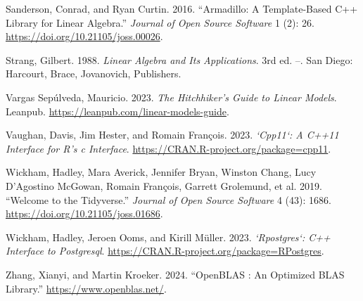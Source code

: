 \begin{cslreferences}
\leavevmode\hypertarget{ref-sanderson2016}{}%
Sanderson, Conrad, and Ryan Curtin. 2016. ``Armadillo: A Template-Based C++ Library for Linear Algebra.'' \emph{Journal of Open Source Software} 1 (2): 26. \url{https://doi.org/10.21105/joss.00026}.

\leavevmode\hypertarget{ref-strang1988}{}%
Strang, Gilbert. 1988. \emph{Linear Algebra and Its Applications}. 3rd ed. --. San Diego: Harcourt, Brace, Jovanovich, Publishers.

\leavevmode\hypertarget{ref-vargas2024}{}%
Vargas Sepúlveda, Mauricio. 2023. \emph{The Hitchhiker's Guide to Linear Models}. Leanpub. \url{https://leanpub.com/linear-models-guide}.

\leavevmode\hypertarget{ref-cpp11}{}%
Vaughan, Davis, Jim Hester, and Romain François. 2023. \emph{`Cpp11`: A C++11 Interface for R's c Interface}. \url{https://CRAN.R-project.org/package=cpp11}.

\leavevmode\hypertarget{ref-wickham2019}{}%
Wickham, Hadley, Mara Averick, Jennifer Bryan, Winston Chang, Lucy D'Agostino McGowan, Romain François, Garrett Grolemund, et al. 2019. ``Welcome to the Tidyverse.'' \emph{Journal of Open Source Software} 4 (43): 1686. \url{https://doi.org/10.21105/joss.01686}.

\leavevmode\hypertarget{ref-rpostgres}{}%
Wickham, Hadley, Jeroen Ooms, and Kirill Müller. 2023. \emph{`Rpostgres`: C++ Interface to Postgresql}. \url{https://CRAN.R-project.org/package=RPostgres}.

\leavevmode\hypertarget{ref-zhang2024}{}%
Zhang, Xianyi, and Martin Kroeker. 2024. ``OpenBLAS : An Optimized BLAS Library.'' \url{https://www.openblas.net/}.
\end{cslreferences}



\address{%
Mauricio Vargas Sepúlveda\\
University of TorontoUniversity of Toronto\\%
Department of Political Science, Toronto, Canada\\ Munk School of Global Affairs and Public Policy, Toronto, Canada\\
%
\url{https://pacha.dev}\\%
\textit{ORCiD: \href{https://orcid.org/0000-0003-1017-7574}{0000-0003-1017-7574}}\\%
\href{mailto:m.sepulveda@mail.utoronto.ca}{\nolinkurl{m.sepulveda@mail.utoronto.ca}}%
}

\address{%
Jonathan Schneider Malamud\\
University of Toronto\\%
Department of Electrical and Computer Engineering, Toronto, Canada\\
%
%
%
\href{mailto:jonathan.schneider@mail.utoronto.ca}{\nolinkurl{jonathan.schneider@mail.utoronto.ca}}%
}
